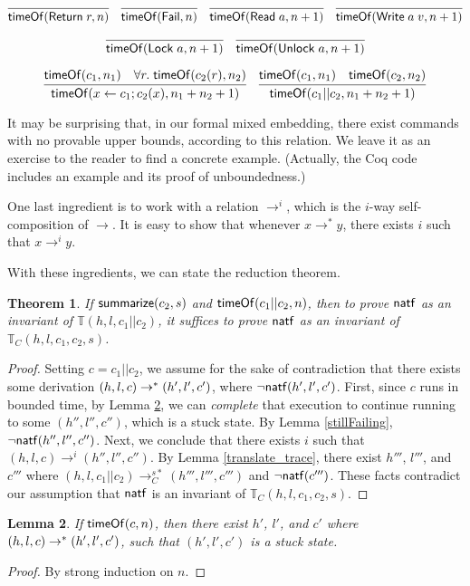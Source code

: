 \documentclass{amsbook}
\newtheorem{theorem}{Theorem}[chapter]
\newtheorem{lemma}[theorem]{Lemma}
\theoremstyle{definition}
\theoremstyle{remark}
\numberwithin{section}{chapter}
\numberwithin{equation}{chapter}
\begin{document}
$$\infer{\tof{\mt{Return} \; r}{n}}{}
\quad \infer{\tof{\mt{Fail}}{n}}{}
\quad \infer{\tof{\mt{Read} \; a}{n+1}}{}
\quad \infer{\tof{\mt{Write} \; a \; v}{n+1}}{}$$

$$\infer{\tof{\mt{Lock} \; a}{n+1}}{}
\quad \infer{\tof{\mt{Unlock} \; a}{n+1}}{}$$

$$\infer{\tof{x \leftarrow c_1; c_2(x)}{n_1 + n_2 + 1}}{
  \tof{c_1}{n_1}
  & \forall r. \; \tof{c_2(r)}{n_2}
}
\quad \infer{\tof{c_1 || c_2}{n_1 + n_2 + 1}}{
  \tof{c_1}{n_1}
  & \tof{c_2}{n_2}
}$$

It may be surprising that, in our formal mixed embedding, there exist commands with no provable upper bounds, according to this relation.
We leave it as an exercise to the reader to find a concrete example.
(Actually, the Coq code includes an example and its proof of unboundedness.)

One last ingredient is to work with a relation $\to^i$, which is the $i$-way self-composition of $\to$.
It is easy to show that whenever $x \to^* y$, there exists $i$ such that $x \to^i y$.

\newcommand{\smallstepsC}[3]{#1 \to_C^{#2*} #3}

With these ingredients, we can state the reduction theorem.
\abstraction
\begin{theorem}
  If $\mathsf{summarize}(c_2, s)$ and $\mathsf{timeOf}(c_1 || c_2, n)$, then to prove $\mathsf{natf}$ as an invariant of $\mathbb T(h, l, c_1 || c_2)$, it suffices to prove $\mathsf{natf}$ as an invariant of $\mathbb T_C(h, l, c_1, c_2, s)$.
\end{theorem}
\begin{proof}
  Setting $c = c_1 || c_2$, we assume for the sake of contradiction that there exists some derivation $(h, l, c) \to^* (h', l', c')$, where $\neg \mathsf{natf}(h', l', c')$.
  First, since $c$ runs in bounded time, by Lemma \ref{completion}, we can \emph{complete} that execution to continue running to some $(h'', l'', c'')$, which is a stuck state.
  By Lemma \ref{stillFailing}, $\neg \mathsf{natf}(h'', l'', c'')$.
  Next, we conclude that there exists $i$ such that $(h, l, c) \to^i (h'', l'', c'')$.
  By Lemma \ref{translate_trace}, there exist $h'''$, $l'''$, and $c'''$ where $\smallstepsC{(h, l, c_1 || c_2)}{s}{(h''', l''', c''')}$ and $\neg \mathsf{natf}(c''')$.
  These facts contradict our assumption that $\mathsf{natf}$ is an invariant of $\mathbb T_C(h, l, c_1, c_2, s)$.
\end{proof}

\begin{lemma}\label{completion}
  If $\mathsf{timeOf}(c, n)$, then there exist $h'$, $l'$, and $c'$ where $(h, l, c) \to^* (h', l', c')$, such that $(h', l', c')$ is a stuck state.
\end{lemma}
\begin{proof}
  By strong induction on $n$.
\end{proof}
\end{document}
